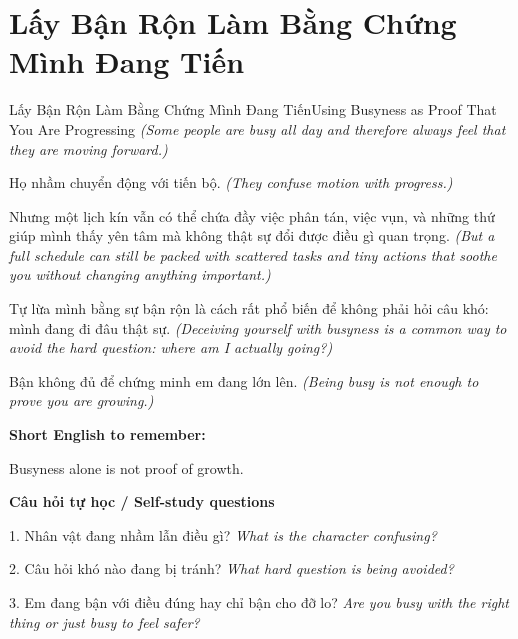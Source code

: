 \section{Lấy Bận Rộn Làm Bằng Chứng Mình Đang Tiến}
\begin{truyen}{Lấy Bận Rộn Làm Bằng Chứng Mình Đang Tiến}{Using Busyness as Proof That You Are Progressing}
\textit{(Some people are busy all day and therefore always feel that they are moving forward.)}

Họ nhầm chuyển động với tiến bộ.
\textit{(They confuse motion with progress.)}

Nhưng một lịch kín vẫn có thể chứa đầy việc phân tán, việc vụn, và những thứ giúp mình thấy yên tâm mà không thật sự đổi được điều gì quan trọng.
\textit{(But a full schedule can still be packed with scattered tasks and tiny actions that soothe you without changing anything important.)}

Tự lừa mình bằng sự bận rộn là cách rất phổ biến để không phải hỏi câu khó: mình đang đi đâu thật sự.
\textit{(Deceiving yourself with busyness is a common way to avoid the hard question: where am I actually going?) }

\end{truyen}

\begin{baihoc}
Bận không đủ để chứng minh em đang lớn lên.
\textit{(Being busy is not enough to prove you are growing.)}
\end{baihoc}

\begin{ghinhoanh}
\textbf{Short English to remember:}

Busyness alone is not proof of growth.

\end{ghinhoanh}

\begin{tuhocnhanh}
\textbf{Câu hỏi tự học / Self-study questions}

1. Nhân vật đang nhầm lẫn điều gì? \textit{What is the character confusing?}

2. Câu hỏi khó nào đang bị tránh? \textit{What hard question is being avoided?}

3. Em đang bận với điều đúng hay chỉ bận cho đỡ lo? \textit{Are you busy with the right thing or just busy to feel safer?}
\end{tuhocnhanh}
\ngancach

